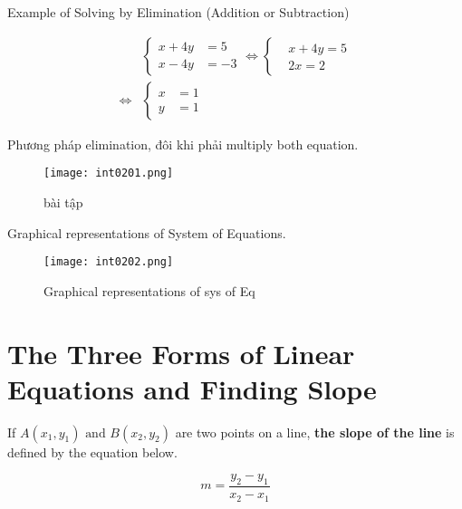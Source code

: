 Example of Solving by Elimination (Addition or Subtraction)

\[
  \begin{aligned}
    &\left\{\begin{aligned} 
      x + 4y &= 5 \\ 
      x - 4y &= -3
    \end{aligned}\right. \iff 
    \left\{\begin{aligned}
      &x +4y = 5\\ 
      &2x = 2
    \end{aligned}\right.
    \\
    \iff &\left\{\begin{aligned} 
      x &= 1 \\ 
      y &= 1
    \end{aligned}\right.
  \end{aligned}
\]

\newpage

Phương pháp elimination, đôi khi phải multiply both equation.

\begin{figure}[htb!]
  \centering
  \texttt{[image: int0201.png]}
  \caption{bài tập}
\end{figure}

Graphical representations of System of Equations.

\begin{figure}[htb!]
  \centering
  \texttt{[image: int0202.png]}
  \caption{Graphical representations of sys of Eq}
\end{figure}

\newpage

\section{The Three Forms of Linear Equations and Finding Slope}




If \(A(x_{1},y_{1})\text{ and } B(x_{2},y_{2})\) are two points on a line, \textbf{the slope of the line} is defined by the equation below.

\begin{equation}
  m = \frac{y_{2}-y_{1}}{x_{2}-x_{1}}
  \label{eq:3.1}
\end{equation}

